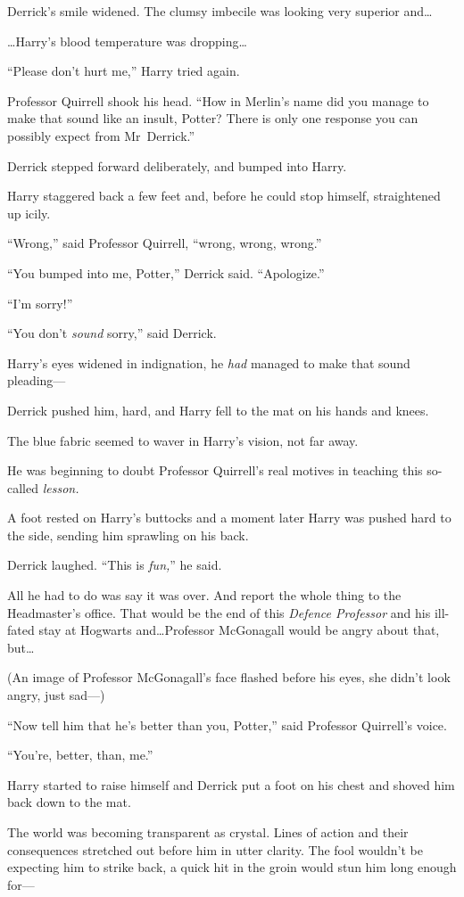 Derrick’s smile widened. The clumsy imbecile was looking very superior and…

…Harry’s blood temperature was dropping…

“Please don’t hurt me,” Harry tried again.

Professor Quirrell shook his head. “How in Merlin’s name did you manage to make that sound like an insult, Potter? There is only one response you can possibly expect from Mr~Derrick.”

Derrick stepped forward deliberately, and bumped into Harry.

Harry staggered back a few feet and, before he could stop himself, straightened up icily.

“Wrong,” said Professor Quirrell, “wrong, wrong, wrong.”

“You bumped into me, Potter,” Derrick said. “Apologize.”

“I’m sorry!”

“You don’t \emph{sound} sorry,” said Derrick.

Harry’s eyes widened in indignation, he \emph{had} managed to make that sound pleading—

Derrick pushed him, hard, and Harry fell to the mat on his hands and knees.

The blue fabric seemed to waver in Harry’s vision, not far away.

He was beginning to doubt Professor Quirrell’s real motives in teaching this so-called \emph{lesson.}

A foot rested on Harry’s buttocks and a moment later Harry was pushed hard to the side, sending him sprawling on his back.

Derrick laughed. “This is \emph{fun,}” he said.

All he had to do was say it was over. And report the whole thing to the Headmaster’s office. That would be the end of this \emph{Defence Professor} and his ill-fated stay at Hogwarts and…Professor McGonagall would be angry about that, but…

(An image of Professor McGonagall’s face flashed before his eyes, she didn’t look angry, just sad—)

“Now tell him that he’s better than you, Potter,” said Professor Quirrell’s voice.

“You’re, better, than, me.”

Harry started to raise himself and Derrick put a foot on his chest and shoved him back down to the mat.

The world was becoming transparent as crystal. Lines of action and their consequences stretched out before him in utter clarity. The fool wouldn’t be expecting him to strike back, a quick hit in the groin would stun him long enough for—

